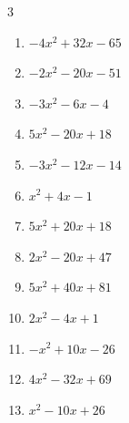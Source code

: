 \begin{multicols}{3}
\begin{enumerate}

  \item $-4x^{2}+32x-65$


  \item $-2x^{2}-20x-51$


\columnbreak %

\resetques

  \item $-3x^{2}-6x-4$


  \item $5x^{2}-20x+18$


  \item $-3x^{2}-12x-14$


  \item $x^{2}+4x-1$


  \item $5x^{2}+20x+18$


  \item $2x^{2}-20x+47$


  \item $5x^{2}+40x+81$


  \item $2x^{2}-4x+1$


  \item $-x^{2}+10x-26$


  \item $4x^{2}-32x+69$


\columnbreak %

  \item $x^{2}-10x+26$


\end{enumerate}
\end{multicols}
